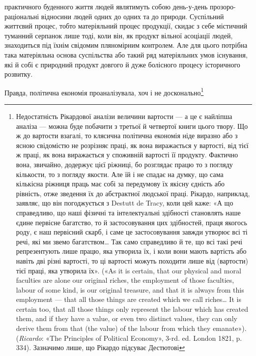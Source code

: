 \parcont{}  %
практичного буденного життя людей являтимуть собою день-у-день прозоро-раціональні відносини людей
одних до одних та до природи. Суспільний життєвий процес, тобто матеріяльний процес продукції,
скидає з себе містичний туманний серпанок лише тоді, коли він, як продукт вільної асоціації людей,
знаходиться під
їхнім свідомим пляномірним контролем. Але для цього потрібна така матеріяльна основа суспільства або
такий ряд матеріяльних умов існування, які й собі є природний продукт довгого й дуже болісного
процесу історичного розвитку.

Правда, політична економія проаналізувала, хоч і не досконально\footnote{
Недостатність Рікардової аналізи величини вартости — а це є найліпша аналіза — можна буде
побачити з третьої й четвертої книги цього твору. Що ж до вартости взагалі, то клясична політична
економія ніде виразно або з ясною свідомістю не розрізняє праці, як вона виражається у вартості, від
тієї ж праці, як вона виражається у споживній вартості її продукту. Фактично вона, звичайно,
додержує цієї ріжниці, бо розглядає працю то з погляду кількости, то з погляду якости. Але їй і не
спадає на думку, що сама кількісна ріжниця праць має собі за передумову їх якісну єдність або
рівність, отже зведення їх до абстрактної людської праці. Рікардо, наприклад, заявляє, що він
погоджується з Destutt de Tracy, коли цей каже: «А що справедливо, що наші фізичні та інтелектуальні
здібності становлять наше єдине первісне багатство, то й застосовування цих здібностей, праця
якогось роду, є наш первісний скарб, і саме це застосовування завжди утворює всі ті речі, які ми
звемо багатством\dots{} Так само справедливо й те, що всі такі речі репрезентують лише працю, яка
утворила їх, і коли вони мають вартість або навіть дві різні вартості, то ці вартості можуть
походити лише від (вартости) тієї праці, яка утворила їх». («As it is certain, that our physical and
moral faculties are alone our original riches, the employment of those faculties, labour of some
kind, is our original treasure, and that it is always from this employment — that all those things
are created which we call riches\dots{} It is certain too, that all those things only represent the
labour which has created them, and if they have a value, or even two distinct values, they can only
derive them from that (the value) of the labour from which they emanate»). (\emph{Ricardo}: «The Principles
of Political Economy», 3-rd. ed. London 1821, p. 334). Зазначимо лише, що Рікардо підсуває Дестютові
}
